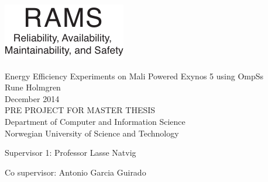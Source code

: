 
\thispagestyle{empty}
\includegraphics[scale=1.1]{fig/rams}
\mbox{}\\[6pc]
\begin{center}
\Huge{Energy Efficiency Experiments on Mali Powered Exynos 5 using OmpSs}\\[2pc]

\Large{Rune Holmgren}\\[1pc]
\large{December 2014}\\[2pc]

PRE PROJECT FOR MASTER THESIS\\
Department of Computer and Information Science\\
Norwegian University of Science and Technology
\end{center}
\vfill

\noindent Supervisor 1: Professor Lasse Natvig

\noindent Co supervisor: Antonio Garcia Guirado

